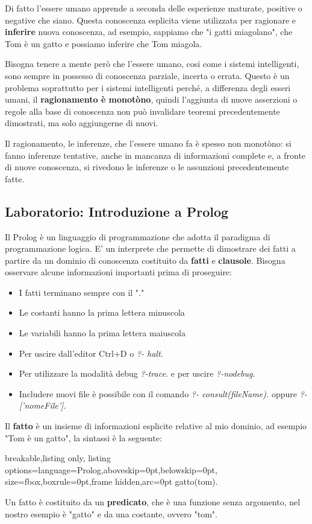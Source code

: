 Di fatto l'essere umano apprende a seconda delle esperienze maturate, positive o negative che siano.
Questa conoscenza esplicita viene utilizzata per ragionare e \textbf{inferire} nuova conoscenza, ad esempio, sappiamo che "i gatti miagolano", che Tom è un gatto e possiamo inferire che Tom miagola.

Bisogna tenere a mente però che l'essere umano, cosi come i sistemi intelligenti, sono sempre in possesso di conoscenza parziale, incerta o errata. Questo è un problema soprattutto per i sistemi intelligenti perché, a differenza degli esseri umani, il \textbf{ragionamento è monotòno}, quindi l'aggiunta di nuove asserzioni o regole alla base di conoscenza non può invalidare teoremi precedentemente dimostrati, ma solo aggiungerne di nuovi.

Il ragionamento, le inferenze, che l'essere umano fa è spesso non monotòno: si fanno inferenze tentative, anche in mancanza di informazioni complete e, a fronte di nuove conoscenza, si rivedono le inferenze o le assunzioni precedentemente fatte.

\subsection{Laboratorio: Introduzione a Prolog}
Il Prolog è un linguaggio di programmazione che adotta il paradigma di programmazione logica. E' un interprete che permette di dimostrare dei fatti a partire da un dominio di conoscenza costituito da \textbf{fatti} e \textbf{clausole}.
Bisogna osservare alcune informazioni importanti prima di proseguire: 
\begin{itemize}
    \item I fatti terminano sempre con il "."
    \item Le costanti hanno la prima lettera minuscola
    \item Le variabili hanno la prima lettera maiuscola
    \item Per uscire dall'editor Ctrl+D o \textit{?- halt.}
    \item Per utilizzare la modalità debug \textit{?-trace.} e per uscire \textit{?-nodebug.}
    \item Includere nuovi file è possibile con il comando \textit{?- consult(fileName).} oppure \textit{?- ['nomeFile'].}
\end{itemize}

Il \textbf{fatto} è un insieme di informazioni esplicite relative al mio dominio, ad esempio "Tom è un gatto", la sintassi è la seguente:
\begin{tcblisting}{breakable,listing only,
  listing options={language=Prolog,aboveskip=0pt,belowskip=0pt},
  size=fbox,boxrule=0pt,frame hidden,arc=0pt}
gatto(tom).
\end{tcblisting}
Un fatto è costituito da un \textbf{predicato}, che è una funzione senza argomento, nel nostro esempio è "gatto" e da una costante, ovvero "tom".

